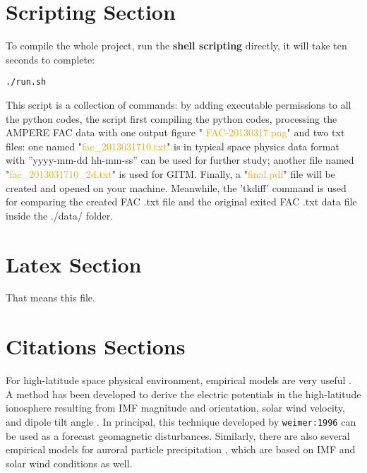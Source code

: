 \documentclass[12pt, letterpaper]{article} %
\begin{document}
\section{Scripting Section} %

\noindent To compile the whole project, run the \textbf{shell scripting} directly, it will take ten seconds to complete:

\begin{verbatim}
./run.sh
\end{verbatim} %

\noindent This script is a collection of commands: by adding executable permissions to all the python codes, the script first compiling the python codes, processing the AMPERE FAC data with one output figure " \textcolor{orange}{FAC-20130317.png}" and two txt files: one named "\textcolor{orange}{fac\_{}2013031710.txt}" is in typical space physics data format with ''yyyy-mm-dd hh-mm-ss'' can be used for further study; another file named "\textcolor{orange}{fac\_{}2013031710\_{}2d.txt}" is used for GITM. Finally, a "\textcolor{orange}{final.pdf}" file will be created and opened on your machine. Meanwhile, the 'tkdiff' command is used for comparing the created FAC .txt file and the original exited FAC .txt data file inside the ./data/ folder.


\section{Latex Section} %

\noindent That means this file. 



\section{Citations Sections} %
For high-latitude space physical environment, empirical models are very useful  
\citet{weimer:1996}. A method has been developed to derive the electric potentials 
in the high-latitude ionosphere resulting from IMF magnitude and orientation, solar 
wind velocity, and dipole tilt angle \citep[chap. 2]{weimer:1996}. In principal, this 
technique developed by {\tt weimer:1996} can be used as a forecast geomagnetic 
disturbances. Similarly, there are also several empirical models for auroral particle 
precipitation \cite[]{hardy:1989,Fuller-Rowell1987}, which are based on IMF and 
solar wind conditions as well. 
\end{document}
